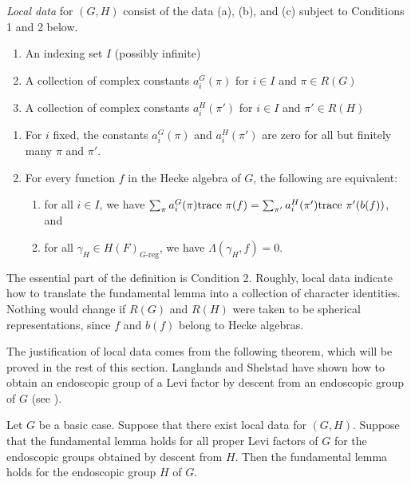 \documentclass{amsart}
\newenvironment{cthm}[1]
  {\renewcommand\thethm{\sc #1}\thm}
  {\endthm}
\newcommand\tr{\text{trace\,}}
\begin{document}
 \begin{cthm}{Definition 4.1} {\it Local data\/}  for $(G,H)$ consist of
 the data (a), (b), and (c) 
subject to Conditions 1 and 2 below.
\begin{enumerate}[label=(\alph*)]
 \item An indexing set $I$ (possibly infinite) 
 \item A collection of complex constants $a_i^G(\pi)$ for $i\in I$
 and $\pi\in R(G)$
 \item A collection of complex constants $a_i^H(\pi')$ for
 $i\in I$ and $\pi'\in R(H)$
\end{enumerate}
\begin{enumerate}[label=(\arabic*)]
 \item
 For $i$ fixed, the constants $a_i^G(\pi)$ and
 $a_i^H(\pi')$ are zero for all but finitely many $\pi$ and $\pi'$.
 \item For every function $f$ in the Hecke algebra of $G$,
 the following are equivalent:
\begin{enumerate}[label=(\Alph*)]
 \item for all $i\in I$, we have $\sum_\pi a^G_i(\pi)\tr\,\pi(f) =
	\sum_{\pi'} a_i^H(\pi')\tr\,\pi'(b(f))$, and
\item for all $\gamma_H\in H(F)_{G\text{-reg}}$, we have $\Lambda(\gamma_H,f)=0$.
\end{enumerate}
\end{enumerate}
\end{cthm}

The essential part of the definition is Condition 2.  Roughly, local
data indicate how to translate the fundamental lemma
into a collection of character identities.
Nothing would change if $R(G)$ and $R(H)$ were
taken to be spherical representations, since $f$ and
$b(f)$ belong to Hecke algebras.



The justification of local data 
comes from the following theorem, which
will be proved in the rest of this section.
Langlands and Shelstad have shown how to obtain
an endoscopic group of a Levi factor by descent from
an endoscopic group of $G$ (see \cite{LS2}).

\begin{cthm}{Theorem 4.2}  Let $G$ be a basic case.
Suppose that there exist local data
for $(G,H)$.  Suppose that the fundamental lemma holds for all proper
Levi factors of $G$ for the endoscopic groups obtained
by descent from $H$.  Then the fundamental lemma holds
for the endoscopic group $H$ of $G$.
\end{cthm}
\end{document}
